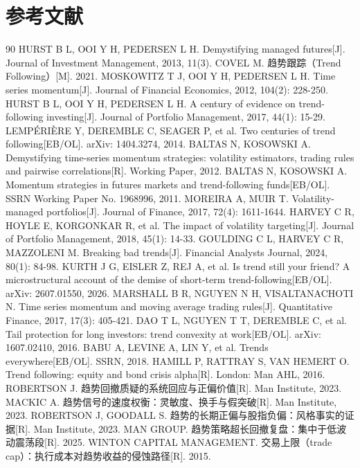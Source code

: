 \documentclass[12pt,a4paper]{ctexart}
\begin{document}
\section{参考文献}
\begin{thebibliography}{90}
 HURST B L, OOI Y H, PEDERSEN L H. Demystifying managed futures[J]. Journal of Investment Management, 2013, 11(3).
 COVEL M. 趋势跟踪（Trend Following）[M]. 2021.
 MOSKOWITZ T J, OOI Y H, PEDERSEN L H. Time series momentum[J]. Journal of Financial Economics, 2012, 104(2): 228-250.
 HURST B L, OOI Y H, PEDERSEN L H. A century of evidence on trend-following investing[J]. Journal of Portfolio Management, 2017, 44(1): 15-29.
 LEMPÉRIÈRE Y, DEREMBLE C, SEAGER P, et al. Two centuries of trend following[EB/OL]. arXiv: 1404.3274, 2014.
 BALTAS N, KOSOWSKI A. Demystifying time-series momentum strategies: volatility estimators, trading rules and pairwise correlations[R]. Working Paper, 2012.
 BALTAS N, KOSOWSKI A. Momentum strategies in futures markets and trend-following funds[EB/OL]. SSRN Working Paper No. 1968996, 2011.
 MOREIRA A, MUIR T. Volatility-managed portfolios[J]. Journal of Finance, 2017, 72(4): 1611-1644.
 HARVEY C R, HOYLE E, KORGONKAR R, et al. The impact of volatility targeting[J]. Journal of Portfolio Management, 2018, 45(1): 14-33.
 GOULDING C L, HARVEY C R, MAZZOLENI M. Breaking bad trends[J]. Financial Analysts Journal, 2024, 80(1): 84-98.
 KURTH J G, EISLER Z, REJ A, et al. Is trend still your friend? A microstructural account of the demise of short-term trend-following[EB/OL]. arXiv: 2607.01550, 2026.
 MARSHALL B R, NGUYEN N H, VISALTANACHOTI N. Time series momentum and moving average trading rules[J]. Quantitative Finance, 2017, 17(3): 405-421.
 DAO T L, NGUYEN T T, DEREMBLE C, et al. Tail protection for long investors: trend convexity at work[EB/OL]. arXiv: 1607.02410, 2016.
 BABU A, LEVINE A, LIN Y, et al. Trends everywhere[EB/OL]. SSRN, 2018.
 HAMILL P, RATTRAY S, VAN HEMERT O. Trend following: equity and bond crisis alpha[R]. London: Man AHL, 2016.
 ROBERTSON J. 趋势回撤质疑的系统回应与正偏价值[R]. Man Institute, 2023.
 MACKIC A. 趋势信号的速度权衡：灵敏度、换手与假突破[R]. Man Institute, 2023.
 ROBERTSON J, GOODALL S. 趋势的长期正偏与股指负偏：风格事实的证据[R]. Man Institute, 2023.
 MAN GROUP. 趋势策略超长回撤复盘：集中于低波动震荡段[R]. 2025.
 WINTON CAPITAL MANAGEMENT. 交易上限（trade cap）：执行成本对趋势收益的侵蚀路径[R]. 2015.

\end{thebibliography}
\end{document}
